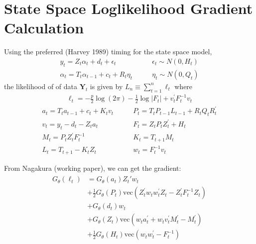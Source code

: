 \documentclass[12pt]{article}
\begin{document}
\section*{State Space Loglikelihood Gradient Calculation}
Using the preferred (Harvey 1989) timing for the state space model,
\begin{align*} 
y_t = Z_t \alpha_t + d_t + \epsilon_t &\qquad \epsilon_t \sim N(0,H_t) \\ 
\alpha_{t} = T_t \alpha_{t-1} + c_t + R_t \eta_t &\qquad \eta_t \sim N(0, Q_t)
\end{align*}
the likelihood of of data $\mathbf{Y}_t$ is given by $L_n \equiv \sum_{t=1}^n \ell_t$ where 
\begin{align}
\ell_t = -\frac{p}{2} \log(2\pi) - \frac{1}{2} \log|F_t| + v_t^\prime F_t^{-1}v_t
\end{align}
\begin{align*}
a_t = T_t a_{t-1} + c_t + K_t v_t &\qquad
P_t = T_t P_{t-1}L_{t-1} + R_t Q_t R_t^\prime \\
v_t = y_t - d_t - Z_ta_t &\qquad
F_t = Z_t P_t Z_t^\prime + H_t \\
M_t = P_t Z_t^\prime F_t^{-1} &\qquad
K_t = T_{t+1} M_t \\
L_t = T_{t+1} - K_t Z_t &\qquad
w_t = F_t^{-1} v_t 
\end{align*} 

\newcommand{\vecop}[0]{\text{vec}}

From Nagakura (working paper), we can get the gradient:
\begin{align}
\begin{split}
G_\theta(\ell_t) &= G_\theta(a_t) Z_t' w_t  \\
 &+ \frac{1}{2} G_\theta(P_t) \vecop (Z_t^\prime w_t w_t^\prime Z_t - Z_t^\prime F_t^{-1} Z_t) \\
 &+ G_\theta(d_t) w_t \\
 &+ G_\theta(Z_t) \vecop (w_t a_t^\prime + w_t v_t^\prime M_t^\prime - M_t^\prime) \\
 &+ \frac{1}{2} G_\theta(H_t) \vecop (w_t w_t^\prime - F_t^{-1})
\end{split}
\end{align}
\end{document}
